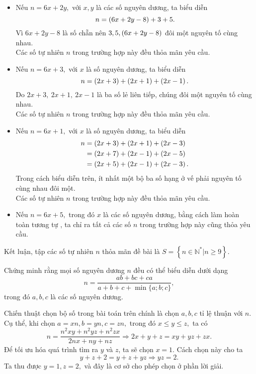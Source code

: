 \begin{gbtt}
{\begin{enumerate}[a,]
    \begin{itemize}
        \item {} Nếu $n= 6x+2y,$ với $x,y$ là các số nguyên dương, ta biểu diễn
        $$n= \left(\displaystyle 6x+2y-8 \right) + 3 + 5.$$
        Vì $6x+2y-8$ là số chẵn nên $3, 5, \left(\displaystyle 6x+2y-8 \right)$ đôi một nguyên tố cùng nhau. \\Các số tự nhiên $n$ trong trường hợp này đều thỏa mãn yêu cầu.
        \item {} Nếu $n=6x+3,$ với $x$ là số nguyên dương, ta biểu diễn
        $$n= \left(\displaystyle 2x+3 \right)+ \left(\displaystyle 2x+1 \right) +\left(\displaystyle 2x-1 \right).$$
        Do $2x+3, \ 2x+1, \ 2x-1$ là ba số lẻ liên tiếp, chúng đôi một nguyên tố cùng nhau.
        \\Các số tự nhiên $n$ trong trường hợp này đều thỏa mãn yêu cầu.        
        \item {} Nếu $n=6x+1,$ với $x$ là số nguyên dương, ta biểu diễn
        \begin{align*}
            n &= \left(\displaystyle 2x+3 \right) +\left(\displaystyle 2x+1 \right)+ \left(\displaystyle 2x-3 \right) \\
            &= \left(\displaystyle 2x+7 \right) + \left(\displaystyle 2x-1 \right) + \left(\displaystyle 2x-5 \right)\\ 
            &= \left(\displaystyle 2x+5 \right) + \left(\displaystyle 2x-1 \right) + \left(\displaystyle 2x-3 \right).
        \end{align*}
        Trong cách biểu diễn trên, ít nhất một bộ ba số hạng ở vế phải nguyên tố cùng nhau đôi một.
        \\Các số tự nhiên $n$ trong trường hợp này đều thỏa mãn yêu cầu.               
        \item {} Nếu $n=6x+5,$ trong đó $x$ là các số nguyên dương, bằng cách làm hoàn toàn tương tự , ta chỉ ra tất cả các số $n$ trong trường hợp này cũng thỏa yêu cầu.
    \end{itemize}
    Kết luận, tập các số tự nhiên $n$ thỏa mãn đề bài là $S=\left\{{n\in \mathbb{N}^*| n \ge 9}\right\}.$
\end{enumerate}
}
\end{gbtt}

\begin{gbtt}
Chứng minh rằng mọi số nguyên dương $n$ đều có thể biểu diễn dưới dạng
\[n=\dfrac{ab+bc+ca}{a+b+c+\min\{a;b;c\}},\]
trong đó $a,b,c$ là các số nguyên dương.
\begin{luuy}
\nx Chiến thuật chọn bộ số trong bài toán trên chính là chọn $a,b,c$ tỉ lệ thuận với $n.$ Cụ thể, khi chọn $a=xn,b=yn,c=zn,$ trong đó $x\le y\le z,$ ta có
$$n=\dfrac{n^2xy+n^2yz+n^2zx}{2nx+ny+nz}\Rightarrow 2x+y+z=xy+yz+zx.$$
Để tối ưu hóa quá trình tìm ra $y$ và $z$, ta sẽ chọn $x=1.$ Cách chọn này cho ta
$$y+z+2=y+z+yz\Rightarrow yz=2.$$
Ta thu được $y=1,z=2,$ và đây là cơ sở cho phép chọn ở phần lời giải.
\end{luuy}
\end{gbtt}

